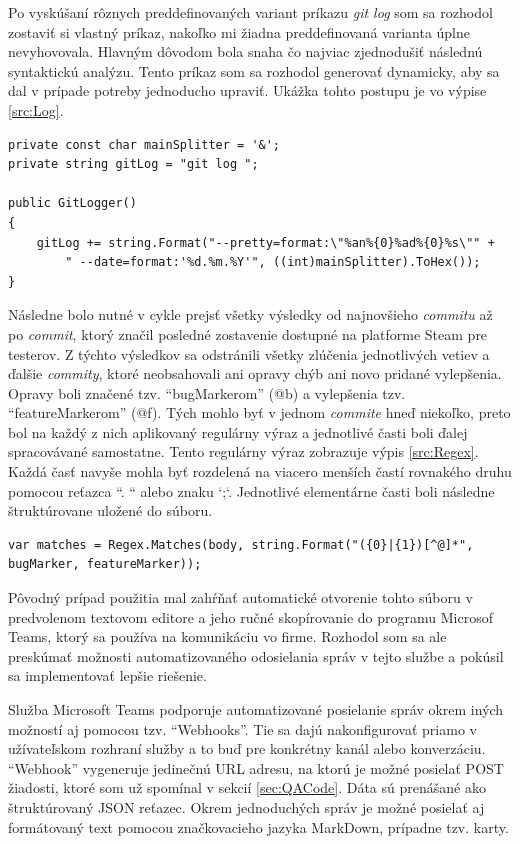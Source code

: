 \documentclass[slovak,bachelorpractice]{diploma}
\begin{document}
Po vyskúšaní rôznych preddefinovaných variant príkazu \textit{git log} som sa rozhodol zostaviť si vlastný príkaz, nakoľko mi žiadna preddefinovaná varianta úplne nevyhovovala. Hlavným dôvodom bola snaha čo najviac zjednodušiť následnú syntaktickú analýzu. Tento príkaz som sa rozhodol generovať dynamicky, aby sa dal v prípade potreby jednoducho upraviť. Ukážka tohto postupu je vo výpise \ref{src:Log}.
\vspace{10pt}
\begin{lstlisting}[label=src:Log,caption={Generovanie vlastného príkazu git log}]
private const char mainSplitter = '&';
private string gitLog = "git log ";

public GitLogger()
{
    gitLog += string.Format("--pretty=format:\"%an%{0}%ad%{0}%s\"" +
        " --date=format:'%d.%m.%Y'", ((int)mainSplitter).ToHex());
}
\end{lstlisting}

Následne bolo nutné v cykle prejsť všetky výsledky od najnovšieho \textit{commitu} až po \textit{commit}, ktorý značil posledné zostavenie dostupné na platforme Steam pre testerov. Z týchto výsledkov sa odstránili všetky zlúčenia jednotlivých vetiev a ďalšie  \textit{commity}, ktoré neobsahovali ani opravy chýb ani novo pridané vylepšenia. Opravy boli značené tzv. \enquote{bugMarkerom} (@b) a vylepšenia tzv. \enquote{featureMarkerom} (@f). Tých mohlo byť v jednom \textit{commite} hneď niekoľko, preto bol na každý z nich aplikovaný regulárny výraz a jednotlivé časti boli ďalej spracovávané samostatne. Tento regulárny výraz zobrazuje výpis \ref{src:Regex}. Každá časť navyše mohla byť rozdelená na viacero menších častí rovnakého druhu pomocou reťazca ``. `` alebo znaku `;`. Jednotlivé elementárne časti boli následne štruktúrovane uložené do súboru.
\vspace{10pt}
\begin{lstlisting}[label=src:Regex,caption={Regulárny výraz na rozdelenie tela \textit{commitu}}]
var matches = Regex.Matches(body, string.Format("({0}|{1})[^@]*", bugMarker, featureMarker));
\end{lstlisting}

Pôvodný prípad použitia mal zahŕňať automatické otvorenie tohto súboru v predvolenom textovom editore a jeho ručné skopírovanie do programu Microsof Teams, ktorý sa používa na komunikáciu vo firme. Rozhodol som sa ale preskúmať možnosti automatizovaného odosielania správ v tejto službe a pokúsil sa implementovať lepšie riešenie.

Služba Microsoft Teams podporuje automatizované posielanie správ okrem iných možností aj pomocou tzv. \enquote{Webhooks}. Tie sa dajú nakonfigurovať priamo v užívateľskom rozhraní služby a to buď pre konkrétny kanál alebo konverzáciu. \enquote{Webhook} vygeneruje jedinečnú URL adresu, na ktorú je možné posielať POST žiadosti, ktoré som už spomínal v sekcií \ref{sec:QACode}. Dáta sú prenášané ako štruktúrovaný JSON reťazec. Okrem jednoduchých správ je možné posielať aj formátovaný text pomocou značkovacieho jazyka MarkDown, prípadne tzv. karty. 
\end{document}
